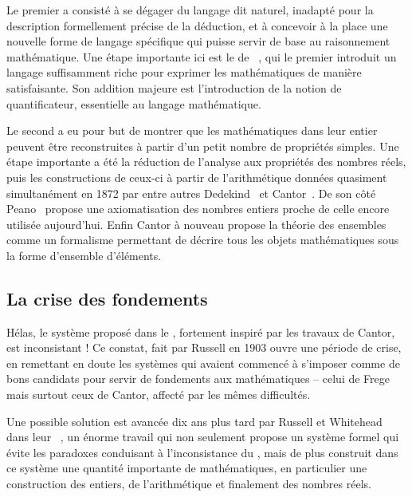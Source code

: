 Le premier a consisté à se dégager du langage dit
naturel, inadapté pour la description formellement précise de la déduction, et à
concevoir à la place une nouvelle forme de langage spécifique qui puisse servir de
base au raisonnement mathématique.
Une étape importante ici est le  de
\citeauthor{Begriffsschrift}~,
qui le premier introduit un langage suffisamment riche pour exprimer les mathématiques
de manière satisfaisante. Son addition majeure est l’introduction
de la notion de quantificateur, essentielle au langage mathématique.

Le second a eu pour but de montrer que les mathématiques dans leur entier peuvent
être reconstruites à partir d’un petit nombre de propriétés simples. Une étape
importante a été la réduction de l’analyse aux propriétés
des nombres réels, puis les constructions de ceux-ci à partir
de l’arithmétique données quasiment simultanément en 1872 par entre autres
Dedekind~ et Cantor~.
De son côté Peano~ propose
une axiomatisation des nombres entiers proche de celle encore utilisée aujourd’hui.
Enfin Cantor à nouveau propose la théorie des ensembles~
comme un formalisme permettant de décrire tous
les objets mathématiques sous la forme d’ensemble d’éléments.

\subsection{La crise des fondements}
Hélas, le système proposé dans le , fortement inspiré par
les travaux de Cantor, est inconsistant !%
Ce constat, fait par Russell en 1903%
ouvre une période de crise, en remettant en doute les systèmes qui avaient commencé à
s’imposer comme de bons candidats pour servir de fondements aux mathématiques –
celui de Frege mais surtout ceux de Cantor, affecté par les mêmes difficultés.

Une possible solution est avancée dix ans plus tard
par Russell et Whitehead dans leur ~,
un énorme travail qui non seulement propose un système
formel qui évite les paradoxes conduisant à l’inconsistance du
, mais de plus construit dans ce système une quantité importante
de mathématiques, en particulier une construction des entiers, de l’arithmétique et
finalement des nombres réels.

